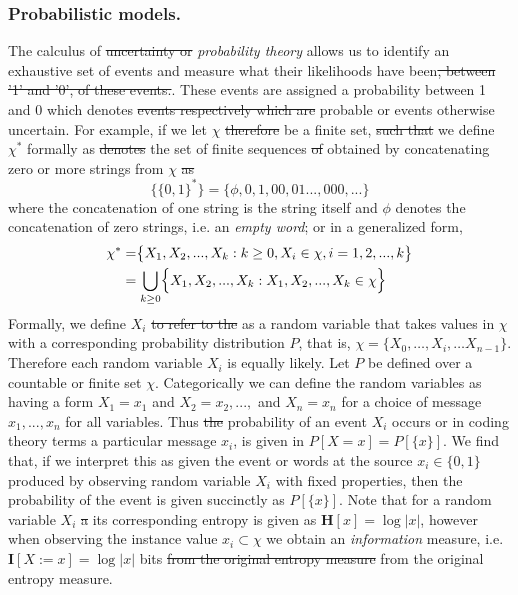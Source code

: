 \documentclass[7pt]{article}
\begin{document}
\subsubsection{Probabilistic models.}
The calculus of \st{uncertainty or} \emph{probability theory} allows us to identify an exhaustive set of events and measure what their likelihoods have been\st{, between '1' and '0', of these events.}. These events are assigned a probability between 1 and 0 which denotes \st{events respectively which are} probable or events otherwise uncertain. For example, if we let $\chi$ \st{therefore} be a finite set, \st{such that} we define $\chi^*$ formally as \st{denotes} the set of finite sequences \st{of} obtained by concatenating zero or more strings from $\chi$ \st{as} 
\begin{equation}
\bigr\{ \{0,1\}^* \bigl\} = \{\phi,0,1,00,01...,000,...\} 
\end{equation}
where the concatenation of one string is the string itself and $\phi$ denotes the concatenation of zero strings, i.e. an \emph{empty word}; or in a generalized form, %
\begin{equation}
\begin{split}
\chi^* & = \bigr\{ X_1, X_2, ... , X_k : k \geq 0, X_i \in \chi, i = 1,2,...,k \bigl\}  \\
& = \large\bigcup_{k\geq0} \bigr\{ X_1, X_2, ... , X_k : X_1, X_2, ... , X_k \in \chi \bigl\} 
\end{split}
\end{equation}
Formally, we define $X_i$  \st{to refer to the}  as a random variable that takes values in $\chi$ with a corresponding probability distribution $P$, that is, $\chi = \{X_0,…,X_i, … X_{n-1}\}$. Therefore  each random variable $X_i$ is equally likely. Let $P$ be defined over a countable or finite set $\chi$. Categorically we can define the random variables as having a form $X_1 = x_1$ and $X_2 = x_2 ,...,$ and $X_n = x_n$  for a choice of message  $x_1, . . . , x_n$ for all variables. Thus \st{the} probability of an event $X_i$ occurs or in coding theory terms a particular message $x_i$,  is given in $P[X=x]= P[\{x\}]$. We find that, if we interpret this as given the event or words at the source $x_i \in \{0,1\}$ produced by observing random variable $X_i$ with fixed properties, then the probability of the event is given succinctly as $P[\{x\}]$. Note that for a random variable $X_i$ \st{a} its corresponding entropy is given as $\mathbf{H}[x] = \log |x|$, however when observing the instance value $x_i \subset \chi$ we obtain an \emph{information}  measure, i.e. $\mathbf{I}[X:=x] = \log |x|$ bits \st{from the original entropy measure} from the original entropy measure.  
\end{document}
